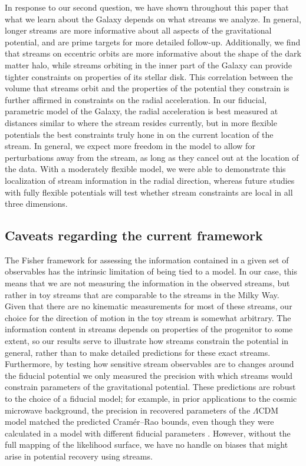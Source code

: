 \documentclass[modern]{aastex62}
\begin{document}
In response to our second question, we have shown throughout this paper that what we learn about the Galaxy depends on what streams we analyze.
In general, longer streams are more informative about all aspects of the gravitational potential, and are prime targets for more detailed follow-up.
Additionally, we find that streams on eccentric orbits are more informative about the shape of the dark matter halo, while streams orbiting in the inner part of the Galaxy can provide tighter constraints on properties of its stellar disk.
This correlation between the volume that streams orbit and the properties of the potential they constrain is further affirmed in constraints on the radial acceleration.
In our fiducial, parametric model of the Galaxy, the radial acceleration is best measured at distances similar to where the stream resides currently, but in more flexible potentials the best constraints truly hone in on the current location of the stream.
In general, we expect more freedom in the model to allow for perturbations away from the stream, as long as they cancel out at the location of the data.
With a moderately flexible model, we were able to demonstrate this localization of stream information in the radial direction, whereas future studies with fully flexible potentials will test whether stream constraints are local in all three dimensions.


\subsection{Caveats regarding the current framework}
\label{sec:dis_caveats}
The Fisher framework for assessing the information contained in a given set of observables has the intrinsic limitation of being tied to a model.
In our case, this means that we are not measuring the information in the observed streams, but rather in toy streams that are comparable to the streams in the Milky Way.
Given that there are no kinematic measurements for most of these streams, our choice for the direction of motion in the toy stream is somewhat arbitrary.
The information content in streams depends on properties of the progenitor to some extent, so our results serve to illustrate how streams constrain the potential in general, rather than to make detailed predictions for these exact streams.
Furthermore, by testing how sensitive stream observables are to changes around the fiducial potential we only measured the precision with which streams would constrain parameters of the gravitational potential.
These predictions are robust to the choice of a fiducial model; for example, in prior applications to the cosmic microwave background, the precision in recovered parameters of the $\Lambda$CDM model matched the predicted Cram\'er--Rao bounds, even though they were calculated in a model with different fiducial parameters \citep{bond1997,spergel2003}.
However, without the full mapping of the likelihood surface, we have no handle on biases that might arise in potential recovery using streams.
\end{document}
